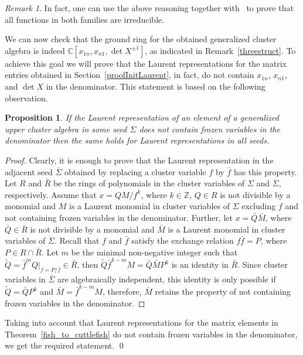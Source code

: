 \documentclass{amsart}
\newtheorem{proposition}[theorem]{Proposition}
\theoremstyle{definition}
\theoremstyle{remark}
\newtheorem{remark}[theorem]{Remark}
\numberwithin{equation}{section}
\numberwithin{theorem}{section}
\def\C{{\mathbb C}}
\def\Z{{\mathbb Z}}
\begin{document}
\begin{remark} In fact, one can use the above reasoning together with~\cite[Lemma 5.5]{Vol} to prove that all functions in both families are irreducible.
\end{remark}

We can now check that the ground ring for the obtained generalized cluster algebra is indeed $\C[x_{1n}, x_{n1}, \det X^{\pm1}]$, as indicated in Remark~\ref{threestruct}. To achieve this goal we will prove that the Laurent representations for the matrix entries obtained in Section~\ref{proofInitLaurent}, in fact, do not contain $x_{1n}$, $x_{n1}$, and $\det X$ in the denominator. This statement is based on the following observation.

\begin{proposition}\label{nofrozen}
If the Laurent representation of an element of a generalized upper cluster algebra in some seed $\Sigma$ does not contain frozen variables in the denominator then the same holds for Laurent representations in all seeds.
\end{proposition}

\begin{proof}  
Clearly, it is enough to prove that the Laurent representation in the adjacent seed $\overline\Sigma$ obtained  by replacing   a cluster variable $f$ by $\bar f$ has this property. Let $R$ and $\bar R$ be the rings of polynomials in the cluster variables of $\Sigma$ and $\overline\Sigma$, respectively. Assume that $x=QM/f^k$, where $k\in\Z$, $Q\in R$ is  not divisible by a monomial and $M$ is a Laurent monomial in cluster variables of $\Sigma$ excluding $f$ and not containing frozen variables in the denominator. Further, let $x=\bar Q\bar M$, where $\bar Q\in\bar R$ is not divisible by a monomial and $\bar M$ is a Laurent monomial in cluster variables of 
$\overline\Sigma$. Recall that $f$ and $\bar f$ satisfy the exchange relation $f\bar f=P$, where $P\in R\cap\bar R$.
Let $m$ be the minimal non-negative integer such that $\tilde Q=\bar f^m \left.Q\right|_{f=P/\bar f}\in\bar R$, then
$\tilde Q \bar f^{k-m}M=\bar Q\bar M P^k$ is an identity in $\bar R$. Since cluster variables in $\overline\Sigma$ are algebraically independent, this identity is only possible if $\tilde Q=\bar Q P^k$ and $\bar M=\bar f^{k-m}M$, therefore, $\bar M$ retains the property of not containing frozen variables in the denominator.
\end{proof}

Taking into account that Laurent representations for the matrix elements in Theorem~\ref{fish_to_cuttlefish} do not contain frozen variables in the denominator, we get the required statement. \qed
\end{document}
